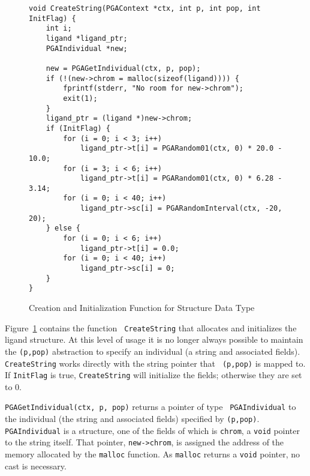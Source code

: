 \documentclass{report}
\begin{document}


\begin{figure}
\begin{verbatim}
void CreateString(PGAContext *ctx, int p, int pop, int InitFlag) {
    int i;
    ligand *ligand_ptr;
    PGAIndividual *new;

    new = PGAGetIndividual(ctx, p, pop);
    if (!(new->chrom = malloc(sizeof(ligand)))) {
        fprintf(stderr, "No room for new->chrom");
        exit(1);
    }
    ligand_ptr = (ligand *)new->chrom;
    if (InitFlag) {
        for (i = 0; i < 3; i++)
            ligand_ptr->t[i] = PGARandom01(ctx, 0) * 20.0 - 10.0;
        for (i = 3; i < 6; i++)
            ligand_ptr->t[i] = PGARandom01(ctx, 0) * 6.28 - 3.14;
        for (i = 0; i < 40; i++)
            ligand_ptr->sc[i] = PGARandomInterval(ctx, -20, 20);
    } else {
        for (i = 0; i < 6; i++)
            ligand_ptr->t[i] = 0.0;
        for (i = 0; i < 40; i++)
            ligand_ptr->sc[i] = 0;
    }
}
\end{verbatim}
\caption{Creation and Initialization Function for Structure Data Type}
\label{example1:new-datatype-create}
\end{figure}


Figure~\ref{example1:new-datatype-create} contains the function {\tt
CreateString} that allocates and initializes the ligand structure.  At this
level of usage it is no longer always possible to maintain the {\tt (p,pop)}
abstraction to specify an individual (a string and associated fields).  {\tt
CreateString} works directly with the string pointer that {\tt
(p,pop)} is mapped to.  If {\tt InitFlag} is true, {\tt CreateString} will
initialize the fields; otherwise they are set to 0.

{\tt PGAGetIndividual(ctx, p, pop)} returns a pointer of type {\tt
PGAIndividual} to the individual (the string and associated fields) specified
by {\tt (p,pop)}.  {\tt PGAIndividual} is a structure, one of the fields of
which is {\tt chrom}, a {\tt void} pointer to the string itself. That pointer,
{\tt new->chrom}, is assigned the address of the memory allocated by
the {\tt malloc} function.  As {\tt malloc} returns a {\tt void} pointer, no
cast is necessary.
\end{document}
